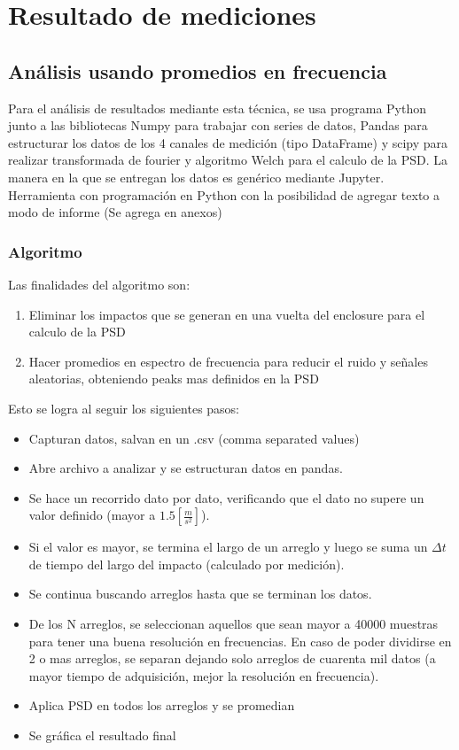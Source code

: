     \section{Resultado de mediciones}        
        \subsection{Análisis usando promedios en frecuencia}
            Para el análisis de resultados mediante esta técnica, se usa programa Python junto a las bibliotecas Numpy para trabajar con series de datos, Pandas para estructurar los datos de los 4 canales de medición (tipo DataFrame) y scipy para realizar transformada de fourier y algoritmo Welch para el calculo de la PSD. La manera en la que se entregan los datos es genérico mediante Jupyter. Herramienta con programación en Python con la posibilidad de agregar texto a modo de informe (Se agrega en anexos)
            \subsubsection{Algoritmo}
                Las finalidades del algoritmo son:
                \begin{enumerate}
                    \item Eliminar los impactos que se generan en una vuelta del enclosure para el calculo de la PSD
                    \item Hacer promedios en espectro de frecuencia para reducir el ruido y señales aleatorias, obteniendo peaks mas definidos en la PSD
                \end{enumerate}
                
                Esto se logra al seguir los siguientes pasos:
                
                \begin{itemize}
                    \item Capturan datos, salvan en un .csv (comma separated values)
                    \item Abre archivo a analizar y se estructuran datos en pandas.
                    \item Se hace un recorrido dato por dato, verificando que el dato no supere un valor definido (mayor a $1.5 [\frac{m}{s^2}]$).
                    \item Si el valor es mayor, se termina el largo de un arreglo y luego se suma un $\Delta t$ de tiempo del largo del impacto (calculado por medición).
                    \item Se continua buscando arreglos hasta que se terminan los datos.
                    \item De los N arreglos, se seleccionan aquellos que sean mayor a 40000 muestras para tener una buena resolución en frecuencias. En caso de poder dividirse en 2 o mas arreglos, se separan dejando solo arreglos de cuarenta mil datos (a mayor tiempo de adquisición, mejor la resolución en frecuencia).                    
                    \item Aplica PSD en todos los arreglos y se promedian
                    \item Se gráfica el resultado final
                \end{itemize}
		        